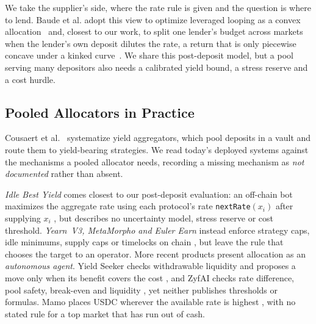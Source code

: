 \documentclass[sigconf]{acmart}
\begin{document}
We take the supplier's side, where the rate rule is given and the question is where to lend. Baude et al. adopt this view to optimize leveraged looping as a convex allocation~\citep{baude2026leveraged} and, closest to our work, to split one lender's budget across markets when the lender's own deposit dilutes the rate, a return that is only piecewise concave under a kinked curve~\citep{baude2026capital}. We share this post-deposit model, but a pool serving many depositors also needs a calibrated yield bound, a stress reserve and a cost hurdle.

\subsection{Pooled Allocators in Practice}

Cousaert et al.~\citep{cousaert2022sok} systematize yield aggregators, which pool deposits in a vault and route them to yield-bearing strategies. We read today's deployed systems against the mechanisms a pooled allocator needs, recording a missing mechanism as \emph{not documented} rather than absent.

\emph{Idle Best Yield} comes closest to our post-deposit evaluation: an off-chain bot maximizes the aggregate rate using each protocol's rate \texttt{nextRate}$(x_i)$ after supplying $x_i$ \citep{idleoverview}, but describes no uncertainty model, stress reserve or cost threshold. \emph{Yearn~V3, MetaMorpho and Euler Earn} instead enforce strategy caps, idle minimums, supply caps or timelocks on chain \citep{yearnvault,metamorpho,eulerhandbook}, but leave the rule that chooses the target to an operator. More recent products present allocation as an \emph{autonomous agent}. Yield Seeker checks withdrawable liquidity and proposes a move only when its benefit covers the cost \citep{ysselection}, and ZyfAI checks rate difference, pool safety, break-even and liquidity \citep{zyftreasury}, yet neither publishes thresholds or formulas. Mamo places USDC wherever the available rate is highest \citep{mamohow}, with no stated rule for a top market that has run out of cash.
\end{document}
